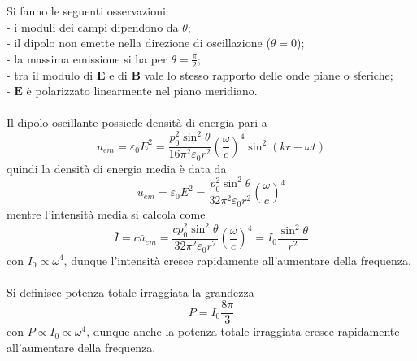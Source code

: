 \documentclass{article}
\begin{document}
Si fanno le seguenti osservazioni:\\
- i moduli dei campi dipendono da $\theta$;\\
- il dipolo non emette nella direzione di oscillazione
($\theta=0$);\\
- la massima emissione si ha per $\theta=\frac{\pi}{2}$;\\
- tra il modulo di \textbf{E} e di \textbf{B} vale lo stesso rapporto delle onde piane o sferiche;\\
- $\textbf{E}$ è polarizzato linearmente nel piano meridiano.\\
\\
Il dipolo oscillante possiede densità di energia pari a 
\begin{equation}
    u_{em}=\varepsilon_0E^2=\frac{p_0^2\sin^2\theta }{16\pi^2 \varepsilon_0 r^2}\left(\frac{\omega}{c}\right)^4\sin^2(kr-\omega t)
    \nonumber
\end{equation}
quindi la densità di energia media è data da
\begin{equation}
    \bar{u}_{em}=\varepsilon_0E^2=\frac{p_0^2\sin^2\theta }{32\pi^2 \varepsilon_0 r^2}\left(\frac{\omega}{c}\right)^4
    \nonumber
\end{equation}
mentre l'intensità media si calcola come
\begin{equation}
    \bar{I}=c\bar{u}_{em}=\frac{cp_0^2\sin^2\theta }{32\pi^2 \varepsilon_0 r^2}\left(\frac{\omega}{c}\right)^4 =I_0\frac{\sin^2\theta}{r^2}
    \nonumber
\end{equation}
con $I_0\propto\omega^4$, dunque l’intensità cresce rapidamente all'aumentare della frequenza.\\
\\
Si definisce potenza totale irraggiata la grandezza
\begin{equation}
    P=I_0\frac{8\pi}{3}
    \nonumber
\end{equation}
con $P\propto I_0\propto\omega^4$, dunque anche la potenza totale irraggiata cresce rapidamente all'aumentare della frequenza.
\end{document}
